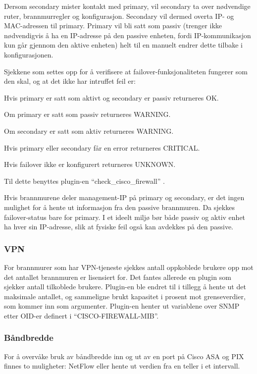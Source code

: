 Dersom secondary mister kontakt med primary, vil secondary ta over nødvendige ruter, brannmurregler og konfigurasjon. Secondary vil dermed overta IP- og MAC-adressen til primary. Primary vil bli satt som passiv (trenger ikke nødvendigvis å ha en IP-adresse på den passive enheten, fordi IP-kommunikasjon kun går gjennom den aktive enheten) helt til en manuelt endrer dette tilbake i konfigurasjonen. \cite{ciscofailover} 

Sjekkene som settes opp for å verifisere at failover-funksjonaliteten fungerer som den skal, og at det ikke har intruffet feil er:
\begin{itemize*}
\item Hvis primary er satt som aktivt og secondary er passiv returneres OK.
\item Om primary er satt som passiv returneres WARNING. 
\item Om secondary er satt som aktiv returneres WARNING.
\item Hvis primary eller secondary får en error returneres CRITICAL.
\item Hvis failover ikke er konfigurert returneres UNKNOWN. 
\end{itemize*}

Til dette benyttes plugin-en ``check\_cisco\_firewall'' \cite{checkciscofirewall}.

Hvis brannmurene deler management-IP på primary og secondary, er det ingen mulighet for å hente ut informasjon fra den passive brannmuren. Da sjekkes failover-status bare for primary. I et ideelt miljø bør både passiv og aktiv enhet ha hver sin IP-adresse, slik at fysiske feil også kan avdekkes på den passive.

\subsubsection{VPN}
For brannmurer som har VPN-tjeneste sjekkes antall oppkoblede brukere opp mot det antallet brannmuren er lisensiert for. Det fantes allerede en plugin som sjekker antall tilkoblede brukere\cite{checkciscovpn}. Plugin-en ble endret til i tillegg å hente ut det maksimale antallet, og sammeligne brukt kapasitet i prosent mot grenseverdier, som kommer inn som argumenter. Plugin-en henter ut variablene over SNMP etter OID-er definert i ``CISCO-FIREWALL-MIB''\cite{cisco_fw_mib}.

\subsubsection{Båndbredde}
For å overvåke bruk av båndbredde inn og ut av en port på Cisco ASA og PIX finnes to muligheter: NetFlow eller hente ut verdien fra en teller i et intervall.

